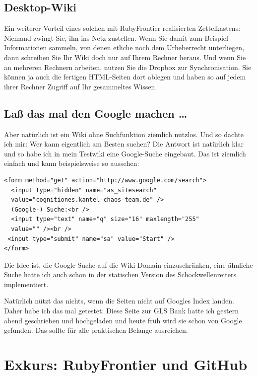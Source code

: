 \documentclass[11pt]{report}
\begin{document}
\section{Desktop-Wiki}
\label{sec-2-10-2}


Ein weiterer Vorteil eines solchen mit RubyFrontier realisierten
Zettelkastens: Niemand zwingt Sie, ihn ins Netz zustellen. Wenn Sie
damit zum Beispiel Informationen sammeln, von denen etliche noch dem
Urheberrecht unterliegen, dann schreiben Sie Ihr Wiki doch nur auf
Ihrem Rechner heraus. Und wenn Sie an mehreren Rechnern arbeiten,
nutzen Sie die Dropbox zur Synchronisation. Sie können ja auch die
fertigen HTML-Seiten dort ablegen und haben so auf jedem ihrer Rechner
Zugriff auf Ihr gesammeltes Wissen.
\section{Laß das mal den Google machen …}
\label{sec-2-10-3}


Aber natürlich ist ein Wiki ohne Suchfunktion ziemlich nutzlos. Und so dachte ich mir: Wer kann eigentlich am Besten suchen? Die Antwort ist natürlich klar und so habe ich in mein Testwiki eine Google-Suche eingebaut. Das ist ziemlich einfach und kann beispielsweise so aussehen:


\begin{verbatim}
<form method="get" action="http://www.google.com/search">
  <input type="hidden" name="as_sitesearch"
  value="cognitiones.kantel-chaos-team.de" />
  (Google-) Suche:<br />
  <input type="text" name="q" size="16" maxlength="255"
  value="" /><br />
 <input type="submit" name="sa" value="Start" />
</form>
\end{verbatim}

Die Idee ist, die Google-Suche auf die Wiki-Domain einzuschränken,
eine ähnliche Suche hatte ich auch schon in der statischen Version des
Schockwellenreiters implementiert.


Natürlich nützt das nichts, wenn die Seiten nicht auf Googles Index
landen. Daher habe ich das mal getestet: Diese Seite zur GLS Bank
hatte ich gestern abend geschrieben und hochgeladen und heute früh
wird sie schon von Google gefunden. Das sollte für alle praktischen
Belange ausreichen.
\chapter{Exkurs: RubyFrontier und GitHub}
\label{sec-2-11}
\end{document}
